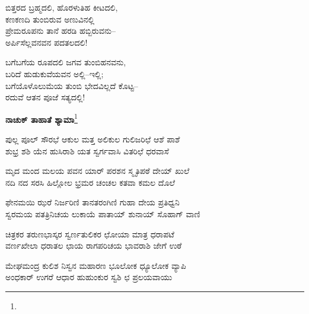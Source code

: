 \begin{myquote}
ಬಿತ್ತರದ ಬ್ರಹ್ಮದಲಿ, ಹೊರಳುತಿಹ ಕೀಟದಲಿ,\\ಕಣಕಣದಿ ತುಂಬಿರುವ ಅಣುವಿನಲ್ಲಿ\\ಪ್ರೇಮರೂಪನು ತಾನೆ ಹರಡಿ ಹಬ್ಬಿರುವನು–\\ಅರ್ಪಿಸೆಲ್ಲವನವನ ಪದತಲದಲಿ!
\end{myquote}

\begin{myquote}
ಬಗೆಬಗೆಯ ರೂಪದಲಿ ಜಗವ ತುಂಬಿಹನವನು,\\ಬರಿದೆ ಹುಡುಕುವೆಯವನ ಅಲ್ಲಿ–ಇಲ್ಲಿ;\\ಬಗೆಯೊಳೊಲುಮೆಯ ತುಂಬಿ ಭೇದವಿಲ್ಲದೆ ಕೊಟ್ಟ–\\ರದುವೆ ಆತನ ಪೂಜೆ ಸತ್ಯದಲ್ಲಿ!
\end{myquote}

\begin{center}
\textbf{ನಾಚುಕ್ ತಾಹಾತೆ ಶ್ಯಾಮಾ}\footnote{}
\end{center}

\begin{myquote}
ಪುಲ್ಲ ಪೂಲ್ ಸೌರಭೆ ಆಕುಲ ಮತ್ತ ಅಲಿಕುಲ ಗುಲಿಜರಿಛೆ ಆಶೆ ಪಾಶೆ\\ಶುಭ್ರ ಶಶಿ ಯೆನ ಹುಸಿರಾಶಿ ಯತ ಸ್ವರ್ಗವಾಸಿ ವಿತರಿಛೆ ಧರವಾಸೆ
\end{myquote}


\begin{myquote}
ಮೃದ ಮಂದ ಮಲಯ ಪವನ ಯಾರ್ ಪರಶನ ಸ್ಮೃತಿಪಠೆ ದೇಯ್ ಖುಲೆ\\ನದಿ ನದ ಸರಸಿ ಹಿಲ್ಲೋಲ ಭ್ರಮರ ಚಂಚಲ ಕತವಾ ಕಮಲ ದೊಲೆ
\end{myquote}


\begin{myquote}
ಫೇನಮಯಿ ಝರೆ ನಿರ್ಜರಿಣಿ ತಾನತರಂಗಿಣಿ ಗುಹಾ ದೇಯ ಪ್ರತಿಧ್ವನಿ\\ಸ್ವರಮಯ ಪತತ್ರಿನಿಚಯ ಲುಕಾಯೆ ಪಾತಾಯ್ ಶುನಾಯ್ ಸೊಹಾಗ್ ವಾಣಿ
\end{myquote}


\begin{myquote}
ಚಿತ್ರಕರ ತರುಣಭಾಸ್ಕರ ಸ್ವರ್ಣತುಲಿಕರ ಛೋಯಾ ಮಾತ್ರ ಧರಾಪಟೆ\\ವರ್ಣಖೇಲಾ ಧರಾತಲ ಛಾಯ ರಾಗಪರಿಚಯ ಭಾವರಾಶಿ ಜೇಗೆ ಉಠೆ
\end{myquote}


\begin{myquote}
ಮೇಘಮಂದ್ರ ಕುಲಿಶ ನಿಸ್ವನ ಮಹಾರಣ ಭೂಲೋಕ ಧ್ಯೂಲೋಕ ವ್ಯಾಪಿ\\ಅಂಧಕಾರ್ ಉಗರೆ ಆಧಾರ ಹುಹುಂಕುರ ಸ್ವಶಿ ಛ ಪ್ರಲಯವಾಯು
\end{myquote}

